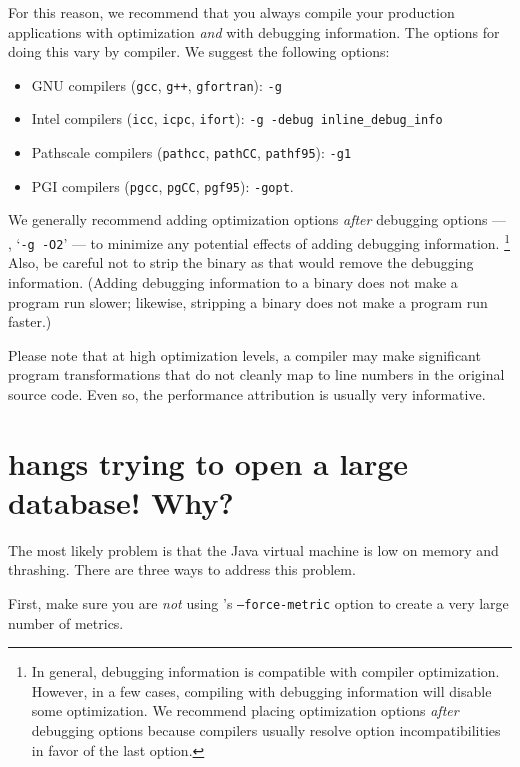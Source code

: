 \documentclass[11pt,letterpaper]{report}
\begin{document}
For this reason, we recommend that you always compile your production applications with optimization \emph{and} with debugging information.
The options for doing this vary by compiler.
We suggest the following options:
\begin{itemize}
\item GNU compilers (\texttt{gcc}, \texttt{g++}, \texttt{gfortran}): \texttt{-g}
\item Intel compilers (\texttt{icc}, \texttt{icpc}, \texttt{ifort}): \texttt{-g -debug inline\_debug\_info}
\item Pathscale compilers (\texttt{pathcc}, \texttt{pathCC}, \texttt{pathf95}): \texttt{-g1}
\item PGI compilers (\texttt{pgcc}, \texttt{pgCC}, \texttt{pgf95}): \texttt{-gopt}.
\end{itemize}
We generally recommend adding optimization options \emph{after} debugging options --- \eg{}, `\texttt{-g -O2}' --- to minimize any potential effects of adding debugging information.%
\footnote{In general, debugging information is compatible with compiler optimization.
However, in a few cases, compiling with debugging information will disable some optimization.
We recommend placing optimization options \emph{after} debugging options because compilers usually resolve option incompatibilities in favor of the last option.}
Also, be careful not to strip the binary as that would remove the debugging information.
(Adding debugging information to a binary does not make a program run slower; likewise, stripping a binary does not make a program run faster.)

Please note that at high optimization levels, a compiler may make significant program transformations that do not cleanly map to line numbers in the original source code.
Even so, the performance attribution is usually very informative.



\section{\hpcviewer{} hangs trying to open a large database! Why?}

The most likely problem is that the Java virtual machine is low on memory and thrashing.
There are three ways to address this problem.

First, make sure you are \emph{not} using \hpcprof{}'s \texttt{--force-metric} option to create a very large number of metrics.
\end{document}
